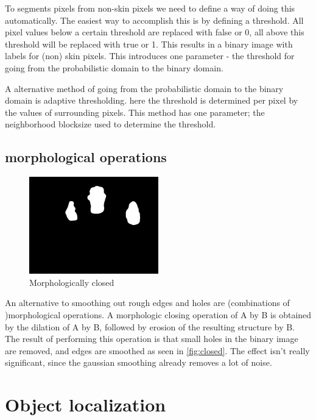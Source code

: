 To segments pixels from non-skin pixels we need to define a way of doing this automatically. The easiest way to accomplish this is by defining a threshold. All pixel values below a certain threshold are replaced with false or 0, all above this threshold will be replaced with true or 1. This results in a binary image with labels for (non) skin pixels. This introduces one parameter - the 
threshold for going from the probabilistic domain to the binary domain.

A alternative method of going from the probabilistic domain to the binary domain is adaptive thresholding. here the threshold is determined per pixel by the values of surrounding pixels. This method has one parameter; the neighborhood blocksize used to determine the threshold.


\subsection*{morphological operations}

\begin{figure}[htbp]
    \center{}
    \includegraphics[width=0.5\textwidth]{figures/pipeline/closed.jpg}
	\caption{Morphologically closed}
	\label{fig:closed}
\end{figure}

An alternative to smoothing out rough edges and holes are (combinations of )morphological operations.  A morphologic closing operation of A by B is obtained by the dilation of A by B, followed by erosion of the resulting structure by B. The result of performing this operation is that small holes in the binary image are removed, and edges are smoothed as seen in \autoref{fig:closed}. The effect isn't really significant, since the gaussian smoothing already removes a lot of noise. 


\section{Object localization}

